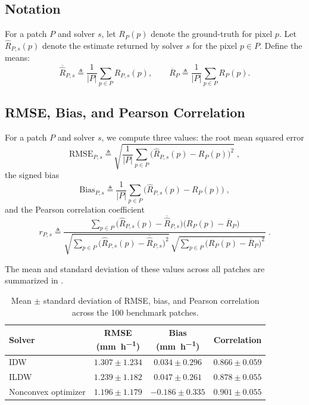 \documentclass[a4paper,fleqn]{cas-sc}
\begin{document}
\subsection{Notation}
For a patch $P$ and solver $s$, let
$R_P(p)$ denote the ground-truth for pixel $p$.
Let $\widehat{R}_{P,s}(p)$ denote the estimate returned by solver $s$ for the pixel $p\in P$.
Define the means:
\[
  \overline{\widehat{R}}_{P,s}\triangleq \frac{1}{|P|}\sum_{p\in P}\widehat{R}_{P,s}(p),
  \qquad
  \overline{R}_P\triangleq \frac{1}{|P|}\sum_{p\in P}R_P(p).
\]

\subsection{RMSE, Bias, and Pearson Correlation}
For a patch $P$ and solver $s$, we  compute three values: the root mean squared error
\[
  \mathrm{RMSE}_{P,s}\triangleq
  \sqrt{\frac{1}{|P|}\sum_{p\in P}\bigl(\widehat{R}_{P,s}(p)-R_P(p)\bigr)^2}\;,
\]
the signed bias
\[
  \mathrm{Bias}_{P,s}\triangleq
  \frac{1}{|P|}\sum_{p\in P}\bigl(\widehat{R}_{P,s}(p)-R_P(p)\bigr)\;,
\]
and the Pearson correlation coefficient
\[
  r_{P,s}\triangleq
  \frac{\sum_{p\in P}\bigl(\widehat{R}_{P,s}(p)-\overline{\widehat{R}}_{P,s}\bigr)\bigl(R_P(p)-\overline{R}_P\bigr)}
  {\sqrt{\sum_{p\in P}\bigl(\widehat{R}_{P,s}(p)-\overline{\widehat{R}}_{P,s}\bigr)^2}\,
    \sqrt{\sum_{p\in P}\bigl(R_P(p)-\overline{R}_P\bigr)^2}}\;.
\]

The mean and standard deviation of these values across all patches are summarized in .

\begin{table}[!htbp]
  \centering
  \begin{tabular}{lccc}
    \toprule
    Solver              & \shortstack{RMSE\\(\si{\milli\meter\per\hour})} & \shortstack{Bias\\(\si{\milli\meter\per\hour})} & Correlation       \\
    \midrule
    IDW                 & $1.307 \pm 1.234$                               & $0.034 \pm 0.296$                               & $0.866 \pm 0.059$ \\
    ILDW                & $1.239 \pm 1.182$                               & $0.047 \pm 0.261$                               & $0.878 \pm 0.055$ \\
    Nonconvex optimizer & $1.196 \pm 1.179$                               & $-0.186 \pm 0.335$                              & $0.901 \pm 0.055$ \\
    \bottomrule
  \end{tabular}
  \caption{Mean \(\pm\) standard deviation of RMSE, bias, and Pearson correlation across the 100 benchmark patches.}
  \label{tab:RMSE}
\end{table}
\end{document}
